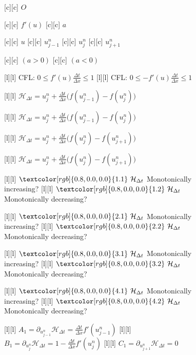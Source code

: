 \begin{figure}[ht]
	\centering
	\footnotesize

	[c] {$O$}

	[c] {$f'(u)$}
	[c] {$a$}

	[c] {$u$}
	[c] {$u^{n}_{j-1}$}
	[c] {$u^{n}_{j}$}
	[c] {$u^{n}_{j+1}$}

	[c] {$(a>0)$}
	[c] {$(a<0)$}

	[l] {CFL: $\displaystyle 0\leq f'(u)\frac{\Delta t}{\Delta x} \leq 1$}
	[l] {CFL: $\displaystyle 0\leq -f'(u)\frac{\Delta t}{\Delta x} \leq 1$}

	[l] {$\displaystyle  \mathcal{H}_{\Delta t}
			= u^{n}_{j} + \frac{\Delta t}{\Delta x}\Big(f(u^{n}_{j-1}) - f(u^{n}_{j})\Big)$}

	[l] {$\displaystyle  \mathcal{H}_{\Delta t}
			= u^{n}_{j} + \frac{\Delta t}{\Delta x}\Big(f(u^{n}_{j-1}) - f(u^{n}_{j})\Big)$}

	[l] {$\displaystyle  \mathcal{H}_{\Delta t}
			= u^{n}_{j} + \frac{\Delta t}{\Delta x}\Big(f(u^{n}_{j}) - f(u^{n}_{j+1})\Big)$}

	[l] {$\displaystyle  \mathcal{H}_{\Delta t}
			= u^{n}_{j} + \frac{\Delta t}{\Delta x}\Big(f(u^{n}_{j}) - f(u^{n}_{j+1})\Big)$}

	[l] {$\textcolor[rgb]{0.8,0.0,0.0}{1.1}\ \mathcal{H}_{\Delta t}$ Monotonically increasing?}
	[l] {$\textcolor[rgb]{0.8,0.0,0.0}{1.2}\ \mathcal{H}_{\Delta t}$ Monotonically decreasing?}

	[l] {$\textcolor[rgb]{0.8,0.0,0.0}{2.1}\ \mathcal{H}_{\Delta t}$ Monotonically increasing?}
	[l] {$\textcolor[rgb]{0.8,0.0,0.0}{2.2}\ \mathcal{H}_{\Delta t}$ Monotonically decreasing?}

	[l] {$\textcolor[rgb]{0.8,0.0,0.0}{3.1}\ \mathcal{H}_{\Delta t}$ Monotonically increasing?}
	[l] {$\textcolor[rgb]{0.8,0.0,0.0}{3.2}\ \mathcal{H}_{\Delta t}$ Monotonically decreasing?}

	[l] {$\textcolor[rgb]{0.8,0.0,0.0}{4.1}\ \mathcal{H}_{\Delta t}$ Monotonically increasing?}
	[l] {$\textcolor[rgb]{0.8,0.0,0.0}{4.2}\ \mathcal{H}_{\Delta t}$ Monotonically decreasing?}

	[l] {$\displaystyle A_{1} = \partial_{u^{n}_{j-1}} \mathcal{H}_{\Delta t}
			= \frac{\Delta t}{\Delta x}f'(u^{n}_{j-1})$}
	[l] {$\displaystyle B_{1} = \partial_{u^{n}_{j}} \mathcal{H}_{\Delta t}
			= 1 - \frac{\Delta t}{\Delta x}f'(u^{n}_{j})$}
	[l] {$\displaystyle C_{1} = \partial_{u^{n}_{j+1}} \mathcal{H}_{\Delta t} = 0$}


\end{figure}
